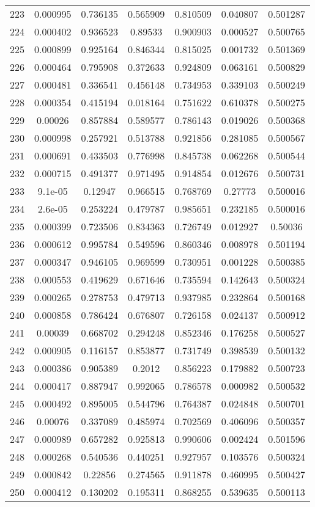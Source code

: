 \begin{table}
\begin{tabular}{c|c|c|c|c|c|c}
223 & 0.000995 & 0.736135 & 0.565909 & 0.810509 & 0.040807 & 0.501287\\
224 & 0.000402 & 0.936523 & 0.89533 & 0.900903 & 0.000527 & 0.500765\\
225 & 0.000899 & 0.925164 & 0.846344 & 0.815025 & 0.001732 & 0.501369\\
226 & 0.000464 & 0.795908 & 0.372633 & 0.924809 & 0.063161 & 0.500829\\
227 & 0.000481 & 0.336541 & 0.456148 & 0.734953 & 0.339103 & 0.500249\\
228 & 0.000354 & 0.415194 & 0.018164 & 0.751622 & 0.610378 & 0.500275\\
229 & 0.00026 & 0.857884 & 0.589577 & 0.786143 & 0.019026 & 0.500368\\
230 & 0.000998 & 0.257921 & 0.513788 & 0.921856 & 0.281085 & 0.500567\\
231 & 0.000691 & 0.433503 & 0.776998 & 0.845738 & 0.062268 & 0.500544\\
232 & 0.000715 & 0.491377 & 0.971495 & 0.914854 & 0.012676 & 0.500731\\
233 & 9.1e-05 & 0.12947 & 0.966515 & 0.768769 & 0.27773 & 0.500016\\
234 & 2.6e-05 & 0.253224 & 0.479787 & 0.985651 & 0.232185 & 0.500016\\
235 & 0.000399 & 0.723506 & 0.834363 & 0.726749 & 0.012927 & 0.50036\\
236 & 0.000612 & 0.995784 & 0.549596 & 0.860346 & 0.008978 & 0.501194\\
237 & 0.000347 & 0.946105 & 0.969599 & 0.730951 & 0.001228 & 0.500385\\
238 & 0.000553 & 0.419629 & 0.671646 & 0.735594 & 0.142643 & 0.500324\\
239 & 0.000265 & 0.278753 & 0.479713 & 0.937985 & 0.232864 & 0.500168\\
240 & 0.000858 & 0.786424 & 0.676807 & 0.726158 & 0.024137 & 0.500912\\
241 & 0.00039 & 0.668702 & 0.294248 & 0.852346 & 0.176258 & 0.500527\\
242 & 0.000905 & 0.116157 & 0.853877 & 0.731749 & 0.398539 & 0.500132\\
243 & 0.000386 & 0.905389 & 0.2012 & 0.856223 & 0.179882 & 0.500723\\
244 & 0.000417 & 0.887947 & 0.992065 & 0.786578 & 0.000982 & 0.500532\\
245 & 0.000492 & 0.895005 & 0.544796 & 0.764387 & 0.024848 & 0.500701\\
246 & 0.00076 & 0.337089 & 0.485974 & 0.702569 & 0.406096 & 0.500357\\
247 & 0.000989 & 0.657282 & 0.925813 & 0.990606 & 0.002424 & 0.501596\\
248 & 0.000268 & 0.540536 & 0.440251 & 0.927957 & 0.103576 & 0.500324\\
249 & 0.000842 & 0.22856 & 0.274565 & 0.911878 & 0.460995 & 0.500427\\
250 & 0.000412 & 0.130202 & 0.195311 & 0.868255 & 0.539635 & 0.500113\\
\end{tabular}
\end{table}

